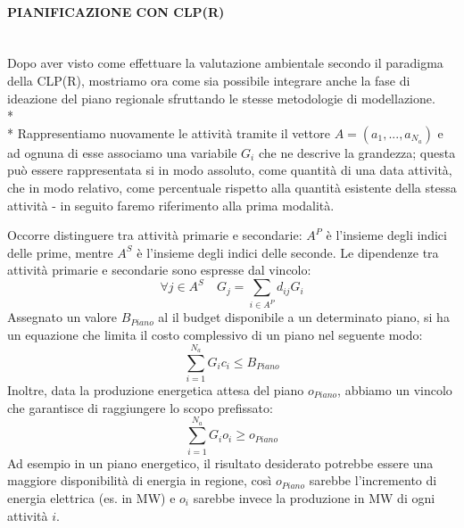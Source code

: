 \documentclass[12pt,a4paper,openright,twoside]{report}
\newcommand{\myparagraph}[1]{\paragraph{#1}\mbox{}\\}
\begin{document}
\myparagraph{PIANIFICAZIONE CON CLP(R)}

Dopo aver visto come effettuare la valutazione ambientale secondo il paradigma della CLP(R), mostriamo ora come sia possibile integrare anche la fase di ideazione del piano regionale sfruttando le stesse metodologie di modellazione.
\\*\\*
Rappresentiamo nuovamente le attività tramite il vettore $A = (a_1,...,a_{N_a})$ e ad ognuna di esse associamo una variabile $G_i$ che ne descrive la grandezza; questa può essere rappresentata si in modo assoluto, come quantità di una data attività, che in modo relativo, come percentuale rispetto alla quantità esistente della stessa attività - in seguito faremo riferimento alla prima modalità.

Occorre distinguere tra attività primarie e secondarie: $A^P$ è l'insieme degli indici delle prime, mentre $A^S$ è l'insieme degli indici delle seconde. Le dipendenze tra attività primarie e secondarie sono espresse dal vincolo:
\begin{equation}
\label{eq:primSec}
	\forall j \in A^S  \quad  G_j = \sum_{i \in A^P} d_{ij} G_i
\end{equation}
Assegnato un valore $B_{Piano}$ al il budget disponibile a un determinato piano, si ha un equazione che limita il costo complessivo di un piano nel seguente modo:
\begin{equation}
\label{eq:costoTotPrimSec}
	\sum_{i=1}^{N_a} G_i c_i \leq B_{Piano}
\end{equation}  
Inoltre, data la produzione energetica attesa del piano $o_{Piano}$, abbiamo un vincolo che garantisce di raggiungere lo scopo prefissato:
\begin{equation}
\label{eq:expOut}
	\sum_{i=1}^{N_a} G_i o_i \geq o_{Piano}
\end{equation}  
Ad esempio in un piano energetico, il risultato desiderato potrebbe essere una maggiore disponibilità di energia in regione, così $o_{Piano}$ sarebbe l'incremento di energia elettrica (es. in MW) e $o_i$ sarebbe invece la produzione in MW di ogni attività $i$.
\end{document}
